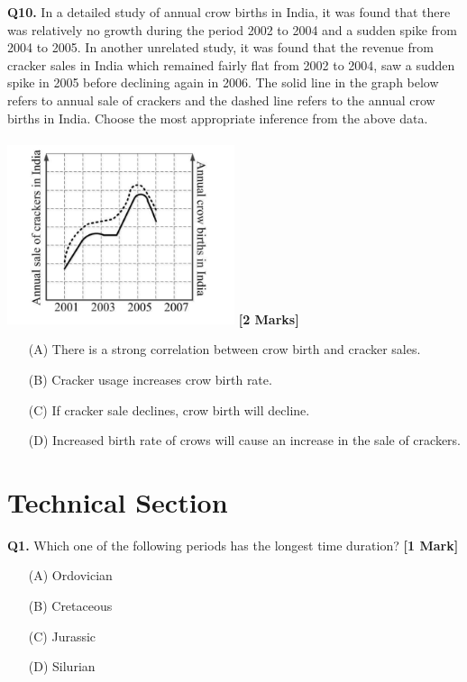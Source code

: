 \documentclass[11pt]{article}
\newcommand{\questiona}[2]{
    \noindent\textbf{Q#2.} #1 \hfill \textbf{[1 Mark]}
}
\newcommand{\questionb}[2]{
    \noindent\textbf{Q#2.} #1 \hfill \textbf{[2 Marks]}
}
\begin{document}
\questionb{In a detailed study of annual crow births in India, it was found that there was relatively no growth during the period 2002 to 2004 and a sudden spike from 2004 to 2005. In another unrelated study, it was found that the revenue from cracker sales in India which remained fairly flat from 2002 to 2004, saw a sudden spike in 2005 before declining again in 2006. The solid line in the graph below refers to annual sale of crackers and the dashed line refers to the annual crow births in India. Choose the most appropriate inference from the above data. \\ \\ \includegraphics[width=0.5\textwidth]{figures/10}}{10}
\begin{enumerate}
    \item[(A)] There is a strong correlation between crow birth and cracker sales.
    \item[(B)] Cracker usage increases crow birth rate.
    \item[(C)] If cracker sale declines, crow birth will decline.
    \item[(D)] Increased birth rate of crows will cause an increase in the sale of crackers.
\end{enumerate}
\vspace{0.5cm}

\section*{Technical Section}

\questiona{Which one of the following periods has the longest time duration?}{1}
\begin{enumerate}
    \item[(A)] Ordovician
    \item[(B)] Cretaceous
    \item[(C)] Jurassic
    \item[(D)] Silurian
\end{enumerate}
\vspace{0.5cm}
\end{document}
